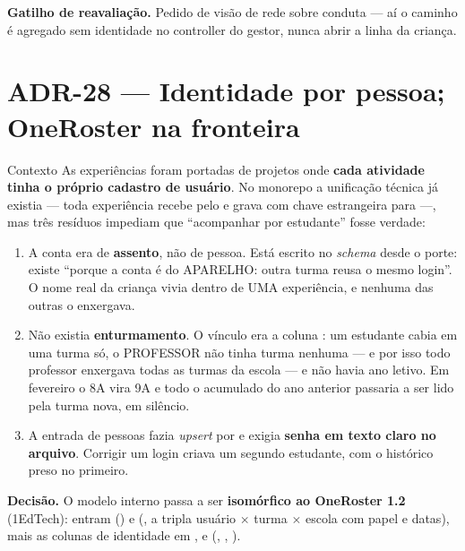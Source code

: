 \textbf{Gatilho de reavaliação.} Pedido de visão de rede sobre conduta ---
aí o caminho é agregado sem identidade no controller do gestor, nunca abrir a
linha da criança.

\section{ADR-28 --- Identidade por pessoa; OneRoster na fronteira}
\label{adr:identidade-enturmamento}

\begin{especificacao}{Contexto}
As experiências foram portadas de projetos onde \textbf{cada atividade tinha o
próprio cadastro de usuário}. No monorepo a unificação técnica já existia --- toda
experiência recebe  pelo  e grava  com
chave estrangeira para  ---, mas três resíduos impediam que
\enquote{acompanhar por estudante} fosse verdade:

\begin{enumerate}
  \item A conta era de \textbf{assento}, não de pessoa. Está escrito no
    \emph{schema} desde o porte:  existe
    \enquote{porque a conta é do APARELHO: outra turma reusa o mesmo login}. O nome
    real da criança vivia dentro de UMA experiência, e nenhuma das outras o
    enxergava.
  \item Não existia \textbf{enturmamento}. O vínculo era a coluna
    : um estudante cabia em uma turma só, o PROFESSOR não tinha
    turma nenhuma --- e por isso todo professor enxergava todas as turmas da
    escola --- e não havia ano letivo. Em fevereiro o 8A vira 9A e todo o
    acumulado do ano anterior passaria a ser lido pela turma nova, em silêncio.
  \item A entrada de pessoas fazia \emph{upsert} por  e exigia
    \textbf{senha em texto claro no arquivo}. Corrigir um login criava um segundo
    estudante, com o histórico preso no primeiro.
\end{enumerate}
\end{especificacao}

\textbf{Decisão.} O modelo interno passa a ser \textbf{isomórfico ao OneRoster
1.2} (1EdTech): entram  () e
 (, a tripla usuário $\times$ turma $\times$ escola
com papel e datas), mais as colunas de identidade em ,  e
 (, , ).

